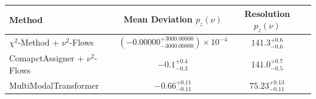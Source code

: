     \begin{tabular}{lccc}
        \toprule
        Method & Mean Deviation $p_{z}(\nu)$ & Resolution $p_{z}(\nu)$ \\
        \midrule
        $\chi^2$-Method + $\nu^2$-Flows & $(-0.00000^{+3000.00000}_{-3000.00000})\times 10^{-4}$ & $141.3^{+0.6}_{-0.6}$ \\
        ComapctAssigner + $\nu^2$-Flows & $-0.1^{+0.4}_{-0.3}$ & $141.0^{+0.7}_{-0.5}$ \\
        MultiModalTransformer & $-0.66^{+0.11}_{-0.11}$ & $75.23^{+0.13}_{-0.11}$ \\
        \bottomrule
    \end{tabular}